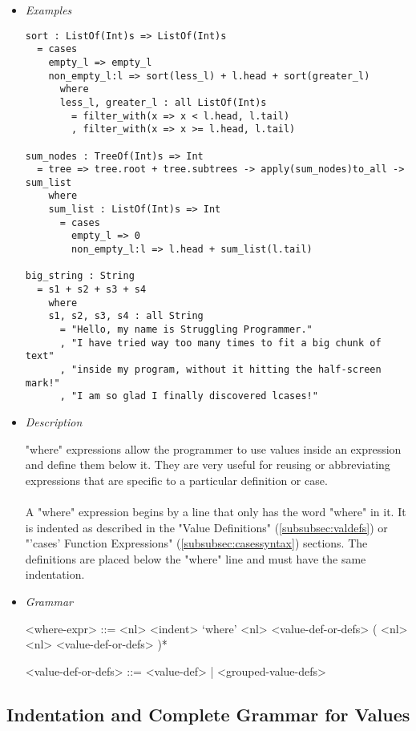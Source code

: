 \documentclass{article}
\begin{document}
\begin{itemize}

\item \textit{Examples}
\begin{verbatim}
sort : ListOf(Int)s => ListOf(Int)s
  = cases
    empty_l => empty_l
    non_empty_l:l => sort(less_l) + l.head + sort(greater_l)
      where
      less_l, greater_l : all ListOf(Int)s
        = filter_with(x => x < l.head, l.tail)
        , filter_with(x => x >= l.head, l.tail)

sum_nodes : TreeOf(Int)s => Int
  = tree => tree.root + tree.subtrees -> apply(sum_nodes)to_all -> sum_list
    where
    sum_list : ListOf(Int)s => Int
      = cases
        empty_l => 0
        non_empty_l:l => l.head + sum_list(l.tail)

big_string : String
  = s1 + s2 + s3 + s4
    where
    s1, s2, s3, s4 : all String
      = "Hello, my name is Struggling Programmer."
      , "I have tried way too many times to fit a big chunk of text"
      , "inside my program, without it hitting the half-screen mark!"
      , "I am so glad I finally discovered lcases!"
\end{verbatim}

\item \textit{Description}

"where" expressions allow the programmer to use values inside an expression and
define them below it. They are very useful for reusing or abbreviating
expressions that are specific to a particular definition or case.
\\\\
A "where" expression begins by a line that only has the word "where" in it. It is
indented as described in the "Value Definitions" (\ref{subsubsec:valdefs}) or
"'cases' Function Expressions" (\ref{subsubsec:casessyntax}) sections.  The
definitions are placed below the "where" line and must have the same
indentation. 

\item \textit{Grammar}
\begin{grammar}
<where-expr> ::=
<nl> <indent> `where' <nl> <value-def-or-defs> ( <nl> <nl> <value-def-or-defs> )*

<value-def-or-defs> ::= <value-def> | <grouped-value-defs> 
\end{grammar}

\end{itemize}

\subsection{Indentation and Complete Grammar for Values}
\end{document}
